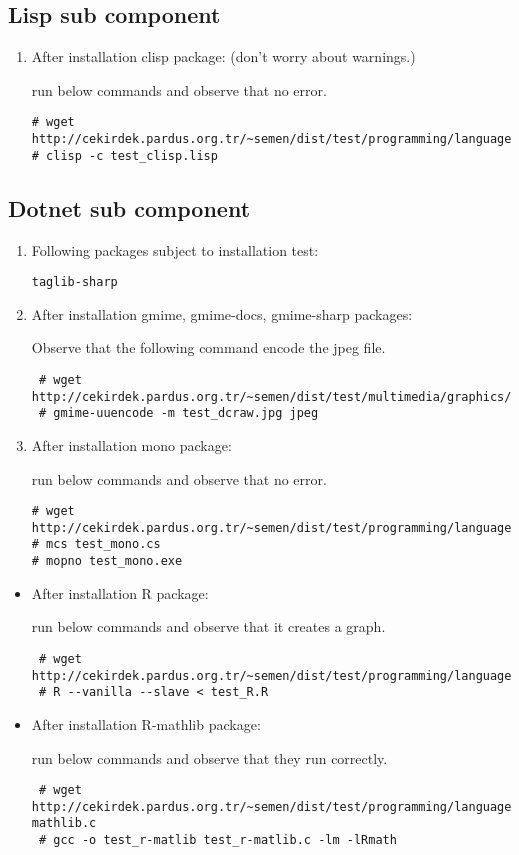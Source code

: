 \documentclass[a4paper,10pt]{article}
\begin{document}
\subsection{Lisp sub component}
\begin{enumerate}
 \item After installation clisp package: (don't worry about warnings.)

run below commands and observe that no error.
\begin{verbatim}
# wget http://cekirdek.pardus.org.tr/~semen/dist/test/programming/language/lisp/test_clisp.lisp 
# clisp -c test_clisp.lisp
\end{verbatim}

\end{enumerate}
\subsection{Dotnet sub component}
\begin{enumerate}
\item Following packages subject to installation test:
\begin{verbatim}
taglib-sharp 
\end{verbatim}

 \item After installation gmime, gmime-docs, gmime-sharp packages:

Observe that the following command encode the jpeg file.
\begin{verbatim}
 # wget http://cekirdek.pardus.org.tr/~semen/dist/test/multimedia/graphics/test_dcraw.jpg
 # gmime-uuencode -m test_dcraw.jpg jpeg
\end{verbatim}
 \item After installation mono package:

run below commands and observe that no error.
\begin{verbatim}
# wget http://cekirdek.pardus.org.tr/~semen/dist/test/programming/language/dotnet/test_mono.cs
# mcs test_mono.cs
# mopno test_mono.exe
\end{verbatim}
\end{enumerate}


\begin{itemize}
 \item After installation R package:

run below commands and observe that it creates a graph.
\begin{verbatim}
 # wget http://cekirdek.pardus.org.tr/~semen/dist/test/programming/language/test_R.R
 # R --vanilla --slave < test_R.R
\end{verbatim}
\item After installation R-mathlib package:

run below commands and observe that they run correctly.	
\begin{verbatim}
 # wget http://cekirdek.pardus.org.tr/~semen/dist/test/programming/language/test_r-mathlib.c
 # gcc -o test_r-matlib test_r-matlib.c -lm -lRmath
\end{verbatim}
\end{itemize}
\end{document}

